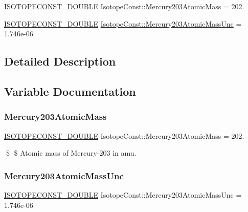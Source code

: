 \begin{DoxyCompactItemize}
\item 
\mbox{\hyperlink{group___isotope_const-_macros_ga8f45a7272ce02c0b4c65c44636ed719a}{I\+S\+O\+T\+O\+P\+E\+C\+O\+N\+S\+T\+\_\+\+D\+O\+U\+B\+LE}} \mbox{\hyperlink{group___isotope_const-_mercury-_hg203_gaed751af1cf34e3b5531bd6bc0550a1fc}{Isotope\+Const\+::\+Mercury203\+Atomic\+Mass}} = 202.
\item 
\mbox{\hyperlink{group___isotope_const-_macros_ga8f45a7272ce02c0b4c65c44636ed719a}{I\+S\+O\+T\+O\+P\+E\+C\+O\+N\+S\+T\+\_\+\+D\+O\+U\+B\+LE}} \mbox{\hyperlink{group___isotope_const-_mercury-_hg203_ga39a0e1055fc5673238b873f5d3b4d5ad}{Isotope\+Const\+::\+Mercury203\+Atomic\+Mass\+Unc}} = 1.\+746e-\/06
\end{DoxyCompactItemize}


\subsection{Detailed Description}


\subsection{Variable Documentation}
\mbox{\label{group___isotope_const-_mercury-_hg203_gaed751af1cf34e3b5531bd6bc0550a1fc}} 
\subsubsection{\texorpdfstring{Mercury203\+Atomic\+Mass}{Mercury203AtomicMass}}
{\footnotesize\ttfamily \mbox{\hyperlink{group___isotope_const-_macros_ga8f45a7272ce02c0b4c65c44636ed719a}{I\+S\+O\+T\+O\+P\+E\+C\+O\+N\+S\+T\+\_\+\+D\+O\+U\+B\+LE}} Isotope\+Const\+::\+Mercury203\+Atomic\+Mass = 202.}

\$ \$ Atomic mass of Mercury-\/203 in amu. \mbox{\label{group___isotope_const-_mercury-_hg203_ga39a0e1055fc5673238b873f5d3b4d5ad}} 
\subsubsection{\texorpdfstring{Mercury203\+Atomic\+Mass\+Unc}{Mercury203AtomicMassUnc}}
{\footnotesize\ttfamily \mbox{\hyperlink{group___isotope_const-_macros_ga8f45a7272ce02c0b4c65c44636ed719a}{I\+S\+O\+T\+O\+P\+E\+C\+O\+N\+S\+T\+\_\+\+D\+O\+U\+B\+LE}} Isotope\+Const\+::\+Mercury203\+Atomic\+Mass\+Unc = 1.\+746e-\/06}

